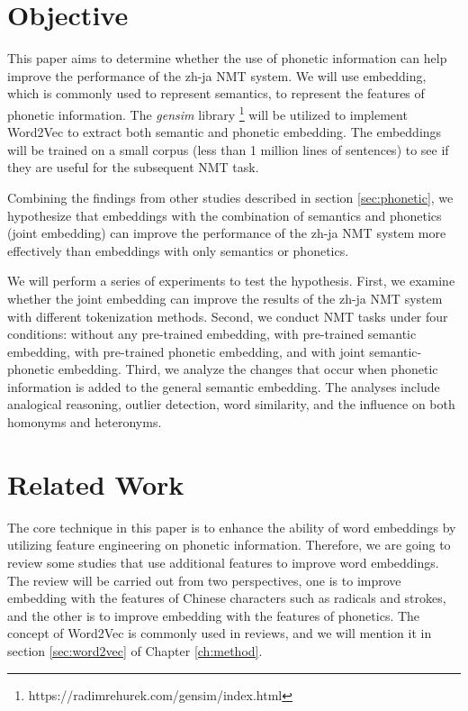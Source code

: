 \section{Objective} \label{sec:objective}

This paper aims to determine whether the use of phonetic information can help improve the performance of the zh-ja NMT system. We will use embedding, which is commonly used to represent semantics, to represent the features of phonetic information. The \textit{gensim} library \footnote{https://radimrehurek.com/gensim/index.html} will be utilized to implement Word2Vec \cite{mikolov2013efficient} to extract both semantic and phonetic embedding. The embeddings will be trained on a small corpus (less than 1 million lines of sentences) to see if they are useful for the subsequent NMT task.

Combining the findings from other studies \cite{liu-etal-2019-robust, khan2019diversity} described in section \ref{sec:phonetic}, we hypothesize that embeddings with the combination of semantics and phonetics (joint embedding) can improve the performance of the zh-ja NMT system more effectively than embeddings with only semantics or phonetics. 

We will perform a series of experiments to test the hypothesis. First, we examine whether the joint embedding can improve the results of the zh-ja NMT system with different tokenization methods. Second, we conduct NMT tasks under four conditions: without any pre-trained embedding, with pre-trained semantic embedding, with pre-trained phonetic embedding, and with joint semantic-phonetic embedding. Third, we analyze the changes that occur when phonetic information is added to the general semantic embedding. The analyses include analogical reasoning, outlier detection, word similarity, and the influence on both homonyms and heteronyms.

\section{Related Work} \label{sec:related_work}

The core technique in this paper is to enhance the ability of word embeddings by utilizing feature engineering on phonetic information. Therefore, we are going to review some studies that use additional features to improve word embeddings. The review will be carried out from two perspectives, one is to improve embedding with the features of Chinese characters such as radicals and strokes, and the other is to improve embedding with the features of phonetics. The concept of Word2Vec \cite{mikolov2013efficient} is commonly used in reviews, and we will mention it in section \ref{sec:word2vec} of Chapter \ref{ch:method}.

